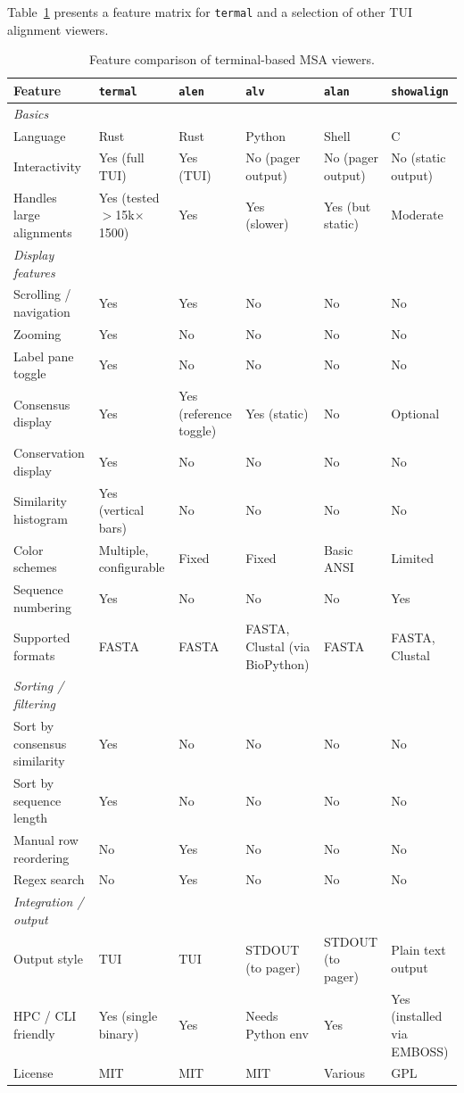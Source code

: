 \documentclass[11pt]{article}
\begin{document}
Table~\ref{tbl:comparison} presents a feature matrix for \texttt{termal} and a
selection of other TUI alignment viewers.

\begin{landscape}
\begin{table}[ht]
\centering
\small
\begin{tabularx}{\linewidth}{lXXXXX}
\toprule
\textbf{Feature} & \textbf{\texttt{termal}} & \textbf{\texttt{alen}} & \textbf{\texttt{alv}} & \textbf{\texttt{alan}} & \textbf{\texttt{showalign}} \\
\midrule
\textit{Basics} \\
Language & Rust & Rust & Python & Shell & C \\
Interactivity & Yes (full TUI) & Yes (TUI) & No (pager output) & No (pager output) & No (static output) \\
Handles large alignments & Yes (tested $>$15k$\times$1500) & Yes & Yes (slower) & Yes (but static) & Moderate \\
\midrule
\textit{Display features} \\
Scrolling / navigation & Yes & Yes & No & No & No \\
Zooming & Yes & No & No & No & No \\
Label pane toggle & Yes & No & No & No & No \\
Consensus display & Yes & Yes (reference toggle) & Yes (static) & No & Optional \\
Conservation display & Yes & No & No & No & No \\
Similarity histogram & Yes (vertical bars) & No & No & No & No \\
Color schemes & Multiple, configurable & Fixed & Fixed & Basic ANSI & Limited \\
Sequence numbering & Yes & No & No & No & Yes \\
Supported formats & FASTA & FASTA & FASTA, Clustal (via BioPython) & FASTA & FASTA, Clustal \\
\midrule
\textit{Sorting / filtering} \\
Sort by consensus similarity & Yes & No & No & No & No \\
Sort by sequence length & Yes & No & No & No & No \\
Manual row reordering & No & Yes & No & No & No \\
Regex search & No & Yes & No & No & No \\
\midrule
\textit{Integration / output} \\
Output style & TUI & TUI & STDOUT (to pager) & STDOUT (to pager) & Plain text output \\
HPC / CLI friendly & Yes (single binary) & Yes & Needs Python env & Yes & Yes (installed via EMBOSS) \\
	License & MIT & MIT & MIT & Various & GPL \\
\bottomrule
\end{tabularx}
\caption{Feature comparison of terminal-based MSA viewers.}
\label{tbl:comparison}
\end{table}
\end{landscape}
\end{document}
